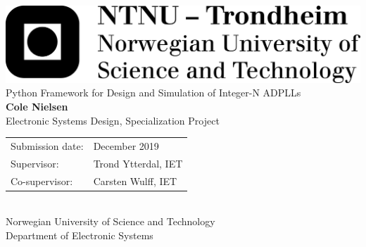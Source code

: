 \documentclass[10pt,a4paper]{article}
\title{\textbf{}}
\date{}
\makeatletter
\def \lineheight {1.5pt}
\def\vhrulefill#1{\leavevmode\leaders\hrule\@height#1\hfill \kern\z@}
\makeatother
\begin{document}
	
	\setlength{\parskip}{12pt} %
	\setlength{\parindent}{0pt}
	\thispagestyle{firstpage}
	\fontfamily{\sfdefault}\selectfont 
	\includegraphics[width=0.5\linewidth]{logo_ntnu_eng_black.png} \\
	\vspace{8em}
	\huge Python Framework for Design and Simulation of Integer-N ADPLLs\\	
	\vspace{3em}
	\huge \textbf{Cole Nielsen}\\
	\vspace{14em}
	\large
	Electronic Systems Design, Specialization Project\\
	\vspace{4pt}
	\FloatBarrier

	\def\arraystretch{1.3}
	\setlength{\tabcolsep}{1em}
	\begin{tabular}{@{} l  l}
	Submission date: & December 2019\\
	Supervisor: & Trond Ytterdal, IET\\
	Co-supervisor: & Carsten Wulff, IET\\
	\end{tabular} \\
	\FloatBarrier
	\vspace{3em}
	Norwegian University of Science and Technology \\ 
	\vspace{4pt}Department of Electronic Systems\\
	
	\pagebreak
	\thispagestyle{blank}
	\null\pagebreak
\end{document}
